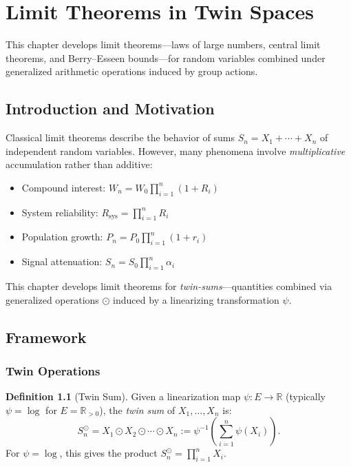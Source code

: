 \documentclass[11pt,twoside,openright]{book}
\theoremstyle{plain}
\theoremstyle{definition}
\newtheorem{definition}[theorem]{Definition}
\theoremstyle{remark}
\newcommand{\Rd}{\mathbb{R}}
\newcommand{\twin}{\odot}
\begin{document}

\chapter{Limit Theorems in Twin Spaces}
\label{ch:limit}

This chapter develops limit theorems---laws of large numbers, central limit theorems, and Berry--Esseen bounds---for random variables combined under generalized arithmetic operations induced by group actions.

\section{Introduction and Motivation}

Classical limit theorems describe the behavior of sums $S_n = X_1 + \cdots + X_n$ of independent random variables. However, many phenomena involve \emph{multiplicative} accumulation rather than additive:
\begin{itemize}
\item Compound interest: $W_n = W_0 \prod_{i=1}^n (1 + R_i)$
\item System reliability: $R_{\text{sys}} = \prod_{i=1}^n R_i$
\item Population growth: $P_n = P_0 \prod_{i=1}^n (1 + r_i)$
\item Signal attenuation: $S_n = S_0 \prod_{i=1}^n \alpha_i$
\end{itemize}

This chapter develops limit theorems for \emph{twin-sums}---quantities combined via generalized operations $\twin$ induced by a linearizing transformation $\psi$.

\section{Framework}

\subsection{Twin Operations}

\begin{definition}[Twin Sum]
Given a linearization map $\psi : E \to \Rd$ (typically $\psi = \log$ for $E = \Rd_{>0}$), the \emph{twin sum} of $X_1, \ldots, X_n$ is:
\begin{equation}
S_n^{\twin} = X_1 \twin X_2 \twin \cdots \twin X_n := \psi^{-1}\left(\sum_{i=1}^n \psi(X_i)\right).
\label{eq:twin-sum}
\end{equation}
For $\psi = \log$, this gives the product $S_n^{\twin} = \prod_{i=1}^n X_i$.
\end{definition}
\end{document}
